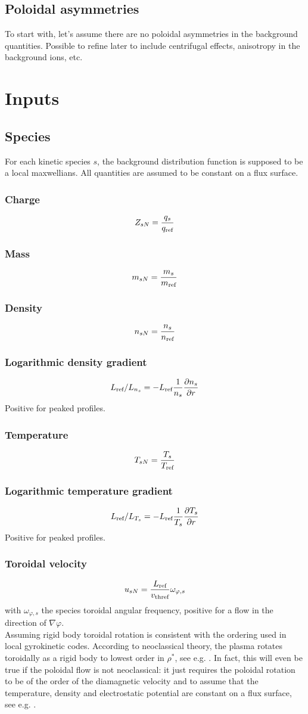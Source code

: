 \documentclass[fleqn]{report}
\begin{document}
\section{Poloidal asymmetries}
To start with, let's assume there are no poloidal asymmetries in the background quantities.
Possible to refine later to include centrifugal effects, anisotropy in the background ions, etc.

\chapter{Inputs}
\section{Species}
For each kinetic species $s$, the background distribution function is supposed to be a local maxwellians. All quantities are assumed to be constant on a flux surface.
\subsection{Charge}
$$Z_{sN}=\frac{q_s}{q_{\textrm{ref}}}$$
\subsection{Mass}
$$m_{sN}=\frac{m_s}{m_{\textrm{ref}}}$$
\subsection{Density}
$$n_{sN}=\frac{n_s}{n_{\textrm{ref}}}$$
\subsection{Logarithmic density gradient}
$$L_{\textrm{ref}}/L_{n_s}=-L_{\textrm{ref}} \frac{1}{n_s}\frac{\partial n_s}{\partial r}$$
Positive for peaked profiles.
\subsection{Temperature}
$$T_{sN}=\frac{T_s}{T_{\textrm{ref}}}$$
\subsection{Logarithmic temperature gradient}
$$L_{\textrm{ref}}/L_{T_s}=-L_{\textrm{ref}} \frac{1}{T_s}\frac{\partial T_s}{\partial r}$$
Positive for peaked profiles.
\subsection{Toroidal velocity}
$$u_{sN}=\frac{L_{\textrm{ref}}}{v_\textrm{thref}}\omega_{\varphi,s}$$
with $\omega_{\varphi,s}$ the species toroidal angular frequency, positive for a flow in the direction of $\nabla \varphi$.\\
Assuming rigid body toroidal rotation is consistent with the ordering used in local gyrokinetic codes. According to neoclassical theory, the plasma rotates toroidally as a rigid body to lowest order in $\rho^*$, see e.g. \cite{Hinton:PoF1985}.
In fact, this will even be true if the poloidal flow is not neoclassical: it just requires the poloidal rotation to be of the order of the diamagnetic velocity and to assume that the temperature, density and electrostatic potential are constant on a flux surface, see e.g. \cite{Bortolon:NF2013}.
\end{document}
